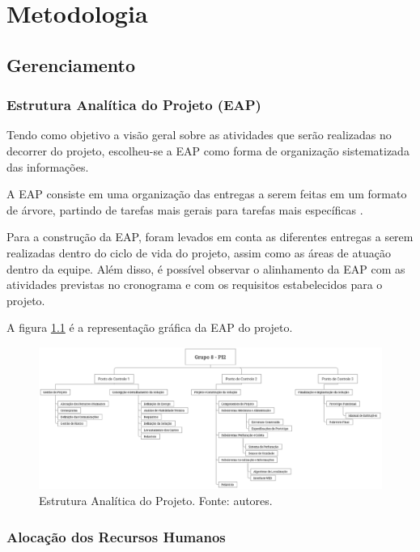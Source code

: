 \chapter{Metodologia}
  \section{Gerenciamento}
    \subsection{Estrutura Analítica do Projeto (EAP)}

      Tendo como objetivo a visão geral sobre as atividades que serão
      realizadas no decorrer do projeto, escolheu-se a EAP como forma
      de organização sistematizada das informações.

      A EAP consiste em uma organização das entregas
      a serem feitas em um formato de árvore, partindo de tarefas
      mais gerais para tarefas mais específicas \cite{pmbok2012}.

      Para a construção da EAP, foram levados em conta as diferentes
      entregas a serem realizadas dentro do ciclo de vida do projeto,
      assim como as áreas de atuação dentro da equipe. Além disso, é
      possível observar o alinhamento da EAP com as atividades previstas
      no cronograma e com os requisitos estabelecidos para o projeto.

      A figura \ref{fig:eap} é a representação gráfica da EAP do projeto.

      \begin{figure}[!htbp]
        \centering
        \includegraphics[width=\textwidth]{figuras/EAP.eps}
        \caption{Estrutura Analítica do Projeto. Fonte: autores.}
        \label{fig:eap}
      \end{figure}

      \vfill
      \pagebreak

    \subsection{Alocação dos Recursos Humanos}

